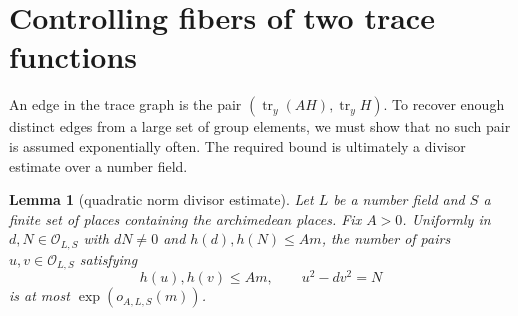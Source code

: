 \documentclass[11pt,reqno]{amsart}
\newtheorem{lemma}[theorem]{Lemma}
\theoremstyle{definition}
\theoremstyle{remark}
\newcommand{\cO}{\mathcal O}
\newcommand{\Tr}{\operatorname{tr}}
\begin{document}
\section{Controlling fibers of two trace functions}
\label{sec:two-traces}

An edge in the trace graph is the pair
\((\Tr_y(AH),\Tr_y H)\).  To recover enough distinct edges from a large
set of group elements, we must show that no such pair is assumed
exponentially often.  The required bound is ultimately a divisor estimate
over a number field.

\begin{lemma}[quadratic norm divisor estimate]
\label{lem:quadratic-norm-divisor}
Let \(L\) be a number field and \(S\) a finite set of places containing the
archimedean places.  Fix \(A>0\).
Uniformly in \(d,N\in\cO_{L,S}\) with \(dN\ne0\) and
\(h(d),h(N)\le Am\), the number of pairs
\(u,v\in\cO_{L,S}\) satisfying
\[
 h(u),h(v)\le Am,
 \qquad u^2-dv^2=N
\]
is at most \(\exp(o_{A,L,S}(m))\).
\end{lemma}
\end{document}
